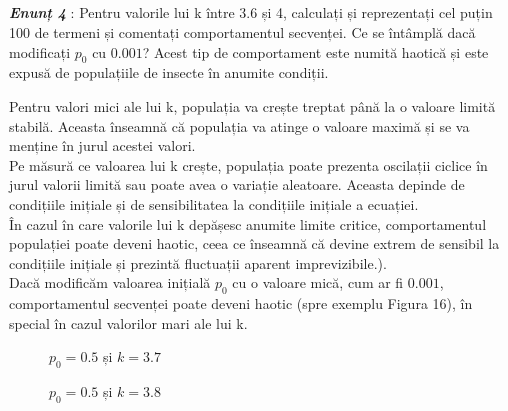 \documentclass[a4paper,12pt]{article}
\begin{document}
\textit{\textbf{\\\\\\\\Enunț 4}} : Pentru valorile lui k între $3.6$ și 4, calculați și reprezentați cel puțin 100 de termeni și comentați comportamentul secvenței. Ce se întâmplă dacă modificați $p_0$ cu $0.001$? Acest tip de comportament este numită haotică și este expusă de populațiile de insecte în anumite condiții.


Pentru valori mici ale lui k, populația va crește treptat până la o valoare limită stabilă. Aceasta înseamnă că populația va atinge o valoare maximă și se va menține în jurul acestei valori.\\
Pe măsură ce valoarea lui k crește, populația poate prezenta oscilații ciclice în jurul valorii limită sau poate avea o variație aleatoare. Aceasta depinde de condițiile inițiale și de sensibilitatea la condițiile inițiale a ecuației.\\
În cazul în care valorile lui k depășesc anumite limite critice, comportamentul populației poate deveni haotic, ceea ce înseamnă că devine extrem de sensibil la condițiile inițiale și prezintă fluctuații aparent imprevizibile.).\\
Dacă modificăm valoarea inițială $p_0$ cu o valoare mică, cum ar fi $0.001$, comportamentul secvenței poate deveni haotic (spre exemplu Figura 16), în special în cazul valorilor mari ale lui k.\\


\begin{figure}[h!]
\centering
{}
\caption{$p_0 = 0.5$ și $k=3.7$}
\end{figure}


\begin{figure}[h!]
\centering
{}
\caption{$p_0 = 0.5$ și $k=3.8$}
\end{figure}
\end{document}
